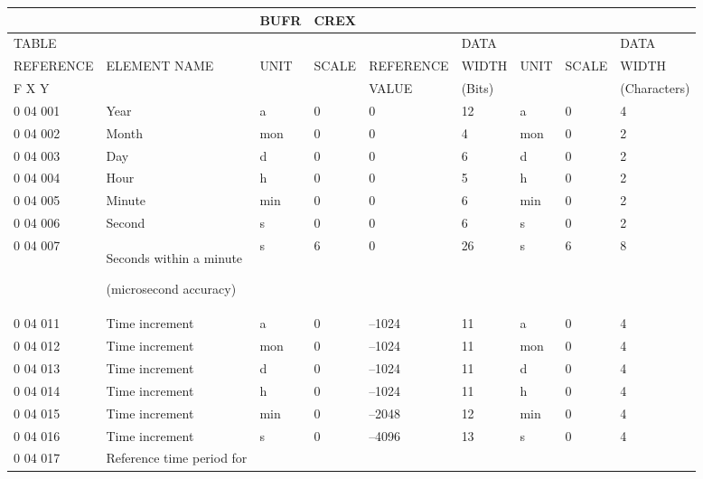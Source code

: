 \begin{longtable}[]{@{}lllllllll@{}}
\toprule
& & BUFR & CREX & & & & &\tabularnewline
\midrule
\endhead
TABLE & & & & & DATA & & & DATA\tabularnewline
REFERENCE & ELEMENT NAME & UNIT & SCALE & REFERENCE & WIDTH & UNIT & SCALE & WIDTH\tabularnewline
F X Y & & & & VALUE & (Bits) & & & (Characters)\tabularnewline
0 04 001 & Year & a & 0 & 0 & 12 & a & 0 & 4\tabularnewline
0 04 002 & Month & mon & 0 & 0 & 4 & mon & 0 & 2\tabularnewline
0 04 003 & Day & d & 0 & 0 & 6 & d & 0 & 2\tabularnewline
0 04 004 & Hour & h & 0 & 0 & 5 & h & 0 & 2\tabularnewline
0 04 005 & Minute & min & 0 & 0 & 6 & min & 0 & 2\tabularnewline
0 04 006 & Second & s & 0 & 0 & 6 & s & 0 & 2\tabularnewline
\begin{minipage}[t]{0.08\columnwidth}\raggedright
0 04 007\strut
\end{minipage} & \begin{minipage}[t]{0.08\columnwidth}\raggedright
Seconds within a minute

(microsecond accuracy)\strut
\end{minipage} & \begin{minipage}[t]{0.08\columnwidth}\raggedright
s\strut
\end{minipage} & \begin{minipage}[t]{0.08\columnwidth}\raggedright
6\strut
\end{minipage} & \begin{minipage}[t]{0.08\columnwidth}\raggedright
0\strut
\end{minipage} & \begin{minipage}[t]{0.08\columnwidth}\raggedright
26\strut
\end{minipage} & \begin{minipage}[t]{0.08\columnwidth}\raggedright
s\strut
\end{minipage} & \begin{minipage}[t]{0.08\columnwidth}\raggedright
6\strut
\end{minipage} & \begin{minipage}[t]{0.08\columnwidth}\raggedright
8\strut
\end{minipage}\tabularnewline
0 04 011 & Time increment & a & 0 & --1024 & 11 & a & 0 & 4\tabularnewline
0 04 012 & Time increment & mon & 0 & --1024 & 11 & mon & 0 & 4\tabularnewline
0 04 013 & Time increment & d & 0 & --1024 & 11 & d & 0 & 4\tabularnewline
0 04 014 & Time increment & h & 0 & --1024 & 11 & h & 0 & 4\tabularnewline
0 04 015 & Time increment & min & 0 & --2048 & 12 & min & 0 & 4\tabularnewline
0 04 016 & Time increment & s & 0 & --4096 & 13 & s & 0 & 4\tabularnewline
\begin{minipage}[t]{0.08\columnwidth}\raggedright
0 04 017\strut
\end{minipage} & \begin{minipage}[t]{0.08\columnwidth}\raggedright
Reference time period for


\end{minipage}
\end{longtable}
